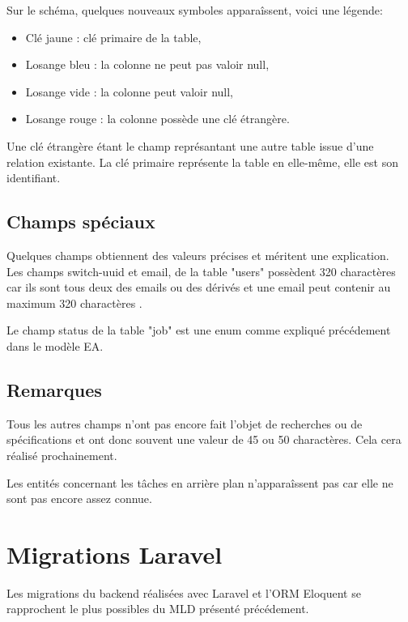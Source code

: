 \documentclass[
    iai, %
    il, %
]{heig-tb}
\begin{document}
Sur le schéma, quelques nouveaux symboles apparaîssent, voici une légende:
\begin{itemize}
    \item Clé jaune : clé primaire de la table,
    \item Losange bleu : la colonne ne peut pas valoir null,
    \item Losange vide : la colonne peut valoir null,
    \item Losange rouge : la colonne possède une clé étrangère.
\end{itemize}

Une clé étrangère étant le champ représantant une autre table issue d'une relation existante. La clé primaire représente la table en elle-même, elle est son identifiant.

\subsection{Champs spéciaux}
Quelques champs obtiennent des valeurs précises et méritent une explication.\\
Les champs switch-uuid et email, de la table "users" possèdent 320 charactères car ils sont tous
deux des emails ou des dérivés et une email peut contenir au maximum 320 charactères \cite{email-length}.

Le champ status de la table "job" est une enum comme expliqué précédement dans le modèle EA.

\subsection{Remarques}
Tous les autres champs n'ont pas encore fait l'objet de recherches ou de spécifications et ont donc souvent une valeur de 45 ou 50 charactères. Cela cera réalisé prochainement.

Les entités concernant les tâches en arrière plan n'apparaîssent pas car elle ne sont pas encore assez connue.



\section{Migrations Laravel}

Les migrations du backend réalisées avec Laravel et l'ORM Eloquent se rapprochent le plus possibles du MLD présenté précédement.
\end{document}
